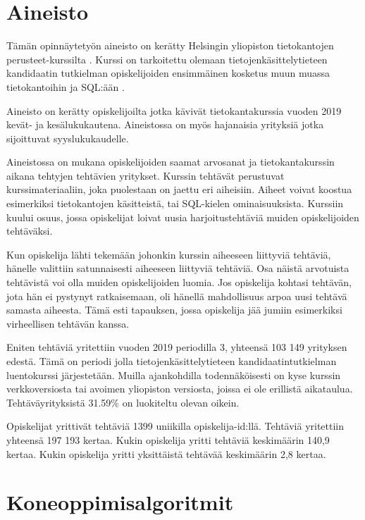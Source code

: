 \documentclass[finnish,twoside,openright]{HYgraduMLDS}
\begin{document}
\section{Aineisto}

Tämän opinnäytetyön aineisto on kerätty Helsingin yliopiston tietokantojen perusteet-kurssilta \cite{tikape2019}. Kurssi on tarkoitettu olemaan tietojenkäsittelytieteen kandidaatin tutkielman opiskelijoiden ensimmäinen kosketus muun muassa tietokantoihin ja SQL:ään \cite{tikape2019}.

Aineisto on kerätty opiskelijoilta jotka kävivät tietokantakurssia vuoden 2019 kevät- ja kesälukukautena. Aineistossa on myös hajanaisia yrityksiä jotka sijoittuvat syyslukukaudelle.

Aineistossa on mukana opiskelijoiden saamat arvosanat ja tietokantakurssin aikana tehtyjen tehtävien yritykset. Kurssin tehtävät perustuvat kurssimateriaaliin, joka puolestaan on jaettu eri aiheisiin. Aiheet voivat koostua esimerkiksi tietokantojen käsitteistä, tai SQL-kielen ominaisuuksista. Kurssiin kuului osuus, jossa opiskelijat loivat uusia harjoitustehtäviä muiden opiskelijoiden tehtäväksi.

Kun opiskelija lähti tekemään johonkin kurssin aiheeseen liittyviä tehtäviä, hänelle valittiin satunnaisesti aiheeseen liittyviä tehtäviä. Osa näistä arvotuista tehtävistä voi olla muiden opiskelijoiden luomia. Jos opiskelija kohtasi tehtävän, jota hän ei pystynyt ratkaisemaan, oli hänellä mahdollisuus arpoa uusi tehtävä samasta aiheesta. Tämä esti tapauksen, jossa opiskelija jää jumiin esimerkiksi virheellisen tehtävän kanssa.

Eniten tehtäviä yritettiin vuoden 2019 periodilla 3, yhteensä 103 149 yrityksen edestä. Tämä on periodi jolla tietojenkäsittelytieteen kandidaatintutkielman luentokurssi järjestetään. Muilla ajankohdilla todennäköisesti on kyse kurssin verkkoversiosta tai avoimen yliopiston versiosta, joissa ei ole erillistä aikataulua. Tehtäväyrityksistä 31.59\% on luokiteltu olevan oikein.

Opiskelijat yrittivät tehtäviä 1399 uniikilla opiskelija-id:llä. Tehtäviä yritettiin yhteensä 197 193 kertaa. Kukin opiskelija yritti tehtäviä keskimäärin 140,9 kertaa. Kukin opiskelija yritti yksittäistä tehtävää keskimäärin 2,8 kertaa. 


\section{Koneoppimisalgoritmit}
\end{document}
